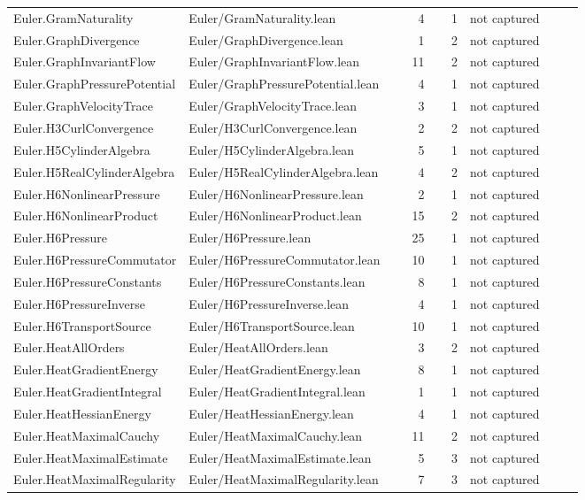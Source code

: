 \documentclass[10pt]{article}
\begin{document}
\begin{longtable}{p{0.28\linewidth}p{0.27\linewidth}r r p{0.20\linewidth}}
Euler.GramNaturality & Euler/GramNaturality.lean & 4 & 1 & not captured\\
Euler.GraphDivergence & Euler/GraphDivergence.lean & 1 & 2 & not captured\\
Euler.GraphInvariantFlow & Euler/GraphInvariantFlow.lean & 11 & 2 & not captured\\
Euler.GraphPressurePotential & Euler/GraphPressurePotential.lean & 4 & 1 & not captured\\
Euler.GraphVelocityTrace & Euler/GraphVelocityTrace.lean & 3 & 1 & not captured\\
Euler.H3CurlConvergence & Euler/H3CurlConvergence.lean & 2 & 2 & not captured\\
Euler.H5CylinderAlgebra & Euler/H5CylinderAlgebra.lean & 5 & 1 & not captured\\
Euler.H5RealCylinderAlgebra & Euler/H5RealCylinderAlgebra.lean & 4 & 2 & not captured\\
Euler.H6NonlinearPressure & Euler/H6NonlinearPressure.lean & 2 & 1 & not captured\\
Euler.H6NonlinearProduct & Euler/H6NonlinearProduct.lean & 15 & 2 & not captured\\
Euler.H6Pressure & Euler/H6Pressure.lean & 25 & 1 & not captured\\
Euler.H6PressureCommutator & Euler/H6PressureCommutator.lean & 10 & 1 & not captured\\
Euler.H6PressureConstants & Euler/H6PressureConstants.lean & 8 & 1 & not captured\\
Euler.H6PressureInverse & Euler/H6PressureInverse.lean & 4 & 1 & not captured\\
Euler.H6TransportSource & Euler/H6TransportSource.lean & 10 & 1 & not captured\\
Euler.HeatAllOrders & Euler/HeatAllOrders.lean & 3 & 2 & not captured\\
Euler.HeatGradientEnergy & Euler/HeatGradientEnergy.lean & 8 & 1 & not captured\\
Euler.HeatGradientIntegral & Euler/HeatGradientIntegral.lean & 1 & 1 & not captured\\
Euler.HeatHessianEnergy & Euler/HeatHessianEnergy.lean & 4 & 1 & not captured\\
Euler.HeatMaximalCauchy & Euler/HeatMaximalCauchy.lean & 11 & 2 & not captured\\
Euler.HeatMaximalEstimate & Euler/HeatMaximalEstimate.lean & 5 & 3 & not captured\\
Euler.HeatMaximalRegularity & Euler/HeatMaximalRegularity.lean & 7 & 3 & not captured\\

\end{longtable}
\end{document}
